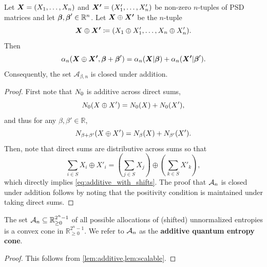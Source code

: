 \documentclass[notitlepage, 10pt]{article}
\begin{document}
\begin{lem}
    \label{lem:additive}
    Let $\boldsymbol{X}=(X_1, \ldots, X_n)$ and $\boldsymbol{X'}=(X'_1, \ldots, X'_n)$ be non-zero $n$-tuples of PSD matrices and let $\boldsymbol{\beta}, \boldsymbol{\beta}' \in \mathbb R^n$.
    Let $\boldsymbol{X}\oplus \boldsymbol{X'}$ be the $n$-tuple
    \begin{equation}
        \boldsymbol{X}\oplus \boldsymbol{X'} \coloneqq (X_1 \oplus X'_1, \ldots, X_n \oplus X'_n).
    \end{equation}
    Then
    \begin{equation}
        \alpha_{n}(\boldsymbol{X}\oplus\boldsymbol{X'}, \boldsymbol{\beta} + \boldsymbol{\beta}') = \alpha_{n}(\boldsymbol{X}|\boldsymbol{\beta}) + \alpha_{n}(\boldsymbol{X'} | \boldsymbol{\beta}').
        \label{eq:additive_with_shifts}
    \end{equation}
    Consequently, the set $\mathcal A_{\beta, n}$ is closed under addition.
\end{lem}
\begin{proof}
    First note that $N_{0}$ is additive across direct sums,
    \begin{equation}
        N_{0}(X \oplus X') = N_{0}(X) + N_{0}(X'),
    \end{equation}
    and thus for any $\beta, \beta' \in \mathbb R$,
    \begin{equation}
        N_{\beta + \beta'}(X \oplus X') = N_{\beta}(X) + N_{\beta'}(X').
    \end{equation}
    Then, note that direct sums are distributive across sums so that
    \begin{equation}
        \sum_{i\in S} X_i \oplus X'_i = \left(\sum_{j\in S} X_j\right) \oplus \left(\sum_{k\in S} X'_k\right),
    \end{equation}
    which directly implies \cref{eq:additive_with_shifts}.
    The proof that $\mathcal A_{n}$ is closed under addition follows by noting that the positivity condition is maintained under taking direct sums.
\end{proof}
\begin{thm}
    The set $\mathcal A_{n} \subseteq \mathbb R_{\geq 0}^{2^n-1}$ of all possible allocations of (shifted) unnormalized entropies is a convex cone in $\mathbb R_{\geq 0}^{2^n-1}$.
    We refer to $\mathcal A_{n}$ as the \textbf{additive quantum entropy cone}.
\end{thm}
\begin{proof}
    This follows from \cref{lem:additive,lem:scalable}.
\end{proof}
\end{document}
